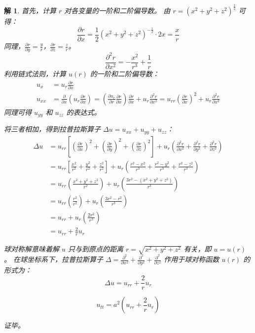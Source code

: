 \documentclass[12pt,a4paper]{article}
\newtheorem*{solution}{解}
\begin{document}
	\begin{solution}

		首先，计算 $r$ 对各变量的一阶和二阶偏导数。
		由 $r = (x^2+y^2+z^2)^{\frac{1}{2}}$ 可得：
		\[
		\frac{\partial r}{\partial x} = \frac{1}{2}(x^2+y^2+z^2)^{-\frac{1}{2}} \cdot 2x = \frac{x}{r}
		\]
		同理，$\frac{\partial r}{\partial y} = \frac{y}{r}$，$\frac{\partial r}{\partial z} = \frac{z}{r}$。
		\[
		\frac{\partial^2 r}{\partial x^2} = - \frac{x^2}{r^3} + \frac{1}{r}
		\]
		利用链式法则，计算 $u(r)$ 的一阶和二阶偏导数：
		\begin{align*}
			u_x &= u_r \frac{\partial r}{\partial x} \\[6pt]
			u_{xx} &= \frac{\partial}{\partial x}\left(u_r \frac{\partial r}{\partial x}\right) = \left(\frac{\partial u_r}{\partial r}\frac{\partial r}{\partial x}\right)\frac{\partial r}{\partial x} + u_r \frac{\partial^2 r}{\partial x^2} = u_{rr}\left(\frac{\partial r}{\partial x}\right)^2 + u_r \frac{\partial^2 r}{\partial x^2}
		\end{align*}
		同理可得 $u_{yy}$ 和 $u_{zz}$ 的表达式。
		
		将三者相加，得到拉普拉斯算子 $\Delta u = u_{xx} + u_{yy} + u_{zz}$：
		\begin{align*}
			\Delta u &= u_{rr} \left[ \left(\frac{\partial r}{\partial x}\right)^2 + \left(\frac{\partial r}{\partial y}\right)^2 + \left(\frac{\partial r}{\partial z}\right)^2 \right] + u_r \left( \frac{\partial^2 r}{\partial x^2} + \frac{\partial^2 r}{\partial y^2} + \frac{\partial^2 r}{\partial z^2} \right) \\[6pt]
			&= u_{rr} \left[ \frac{x^2}{r^2} + \frac{y^2}{r^2} + \frac{z^2}{r^2} \right] + u_r \left( \frac{r^2-x^2}{r^3} + \frac{r^2-y^2}{r^3} + \frac{r^2-z^2}{r^3} \right) \\[6pt]
			&= u_{rr} \left( \frac{x^2+y^2+z^2}{r^2} \right) + u_r \left( \frac{3r^2 - (x^2+y^2+z^2)}{r^3} \right) \\[6pt]
			&= u_{rr} \left( \frac{r^2}{r^2} \right) + u_r \left( \frac{3r^2 - r^2}{r^3} \right) \\
			&= u_{rr} + u_r \left( \frac{2r^2}{r^3} \right) \\[6pt]
			&= u_{rr} + \frac{2}{r} u_r
		\end{align*}
		
		
		
		球对称解意味着解 $u$ 只与到原点的距离 $r = \sqrt{x^2+y^2+z^2}$ 有关，即 $u=u(r)$。
		在球坐标系下，拉普拉斯算子 $\Delta = \frac{\partial^2}{\partial x^2} + \frac{\partial^2}{\partial y^2} + \frac{\partial^2}{\partial z^2}$ 作用于球对称函数 $u(r)$ 的形式为：
		\[
		\Delta u = u_{rr} + \frac{2}{r} u_r
		\]
		
		\[
		u_{tt} = a^2 \left(u_{rr} + \frac{2}{r} u_r \right)
		\]
		
		证毕。
	\end{solution}
	
\end{document}
